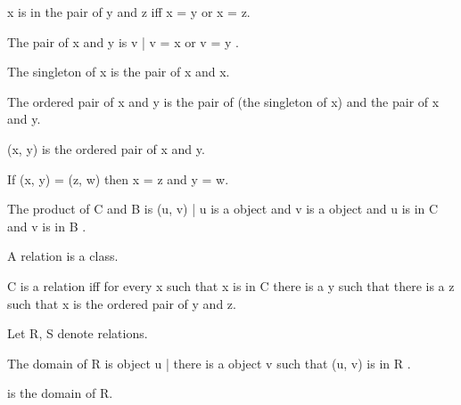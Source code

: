 \documentclass{article}
\begin{document}
\begin{forthel}
    \begin{axiom}[Pair]
      x is in the pair of y and z iff x = y or x = z.
    \end{axiom}

    \begin{lemma}
      The pair of x and y is { v | v = x or v = y }.
    \end{lemma}

    \begin{definition}
      The singleton of x is the pair of x and x.
    \end{definition}

    \begin{definition}
      The ordered pair of x and y is the pair of (the singleton of x) and the pair of x and y.
    \end{definition}

    \begin{definition}
      (x, y) is the ordered pair of x and y.
    \end{definition}

    \begin{lemma}[OrdPair]
      If (x, y) = (z, w) then x = z and y = w.
    \end{lemma}

    \begin{definition}
      The product of C and B is { (u, v) | u is a object and v is a object and u is in C and v is in B }.
    \end{definition}

    \begin{signature}
      A relation is a class.
    \end{signature}

    \begin{axiom}[RelationIntro]
      C is a relation iff for every x such that x is in C
        there is a y such that there is a z such that x is the ordered pair of y and z.
    \end{axiom}

    Let R, S denote relations.

    \begin{definition} 
      The domain of R is { object u | there is a object v such that (u, v) is in R }.
    \end{definition}

    \begin{definition} 
       is the domain of R.
    \end{definition}
    

\end{forthel}
\end{document}
